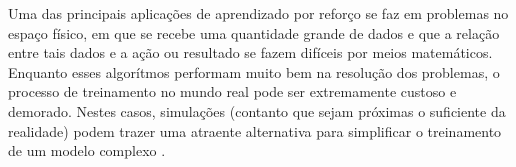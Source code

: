 Uma das principais aplica{\c c}{\~o}es de aprendizado por refor{\c c}o
se faz em problemas no espa{\c c}o f{\'i}sico, em que se recebe uma
quantidade grande de dados e que a rela{\c c}{\~a}o entre tais dados e
a a{\c c}{\~a}o ou resultado se fazem dif{\'i}ceis por meios
matem{\'a}ticos. Enquanto esses algor{\'i}tmos performam muito bem na
resolu{\c c}{\~a}o dos problemas, o processo de treinamento no mundo
real pode ser extremamente custoso e demorado. Nestes casos, simula{\c
  c}{\~o}es (contanto que sejam pr{\'o}ximas o suficiente da
realidade) podem trazer uma atraente alternativa para simplificar o
treinamento de um modelo complexo \cite{Rao_2020_CVPR}.
